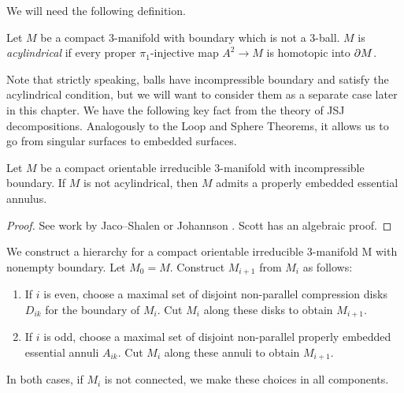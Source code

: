 We will need the following definition.

\begin{defn}

Let $M$ be a compact $3$-manifold with boundary which is not a 3-ball. $M$ is
\emph{acylindrical} if every proper $\pi_1$-injective map $A^2 \to M$ is
homotopic into $\partial M$.

\end{defn}

Note that strictly speaking, balls have incompressible boundary and satisfy the
acylindrical condition, but we will want to consider them as a separate case
later in this chapter. We have the following key fact from the theory of JSJ
decompositions.  Analogously to the Loop and Sphere Theorems, it allows us to
go from singular surfaces to embedded surfaces.

\begin{thm}

Let $M$ be a compact orientable irreducible $3$-manifold with incompressible
boundary. If $M$ is not acylindrical, then $M$ admits a properly embedded
essential annulus.

\end{thm}

\begin{proof}

See work by Jaco--Shalen \cite{JacoShalen} or Johannson \cite{Johannson}. Scott
\cite{Scottannulus} has an algebraic proof.

\end{proof}

We construct a hierarchy for a compact orientable irreducible $3$-manifold
M with nonempty boundary.  Let $M_0 = M$.  Construct $M_{i+1}$ from $M_i$ as
follows:

\begin{enumerate}

\item If $i$ is even, choose a maximal set of disjoint non-parallel compression
disks $D_{ik}$ for the boundary of $M_i$. Cut $M_i$ along these disks to obtain
$M_{i+1}$.

\item If $i$ is odd, choose a maximal set of disjoint non-parallel properly
embedded essential annuli $A_{ik}$. Cut $M_i$ along these annuli to obtain
$M_{i+1}$.

\end{enumerate}

In both cases, if $M_i$ is not connected, we make these choices in all
components.


